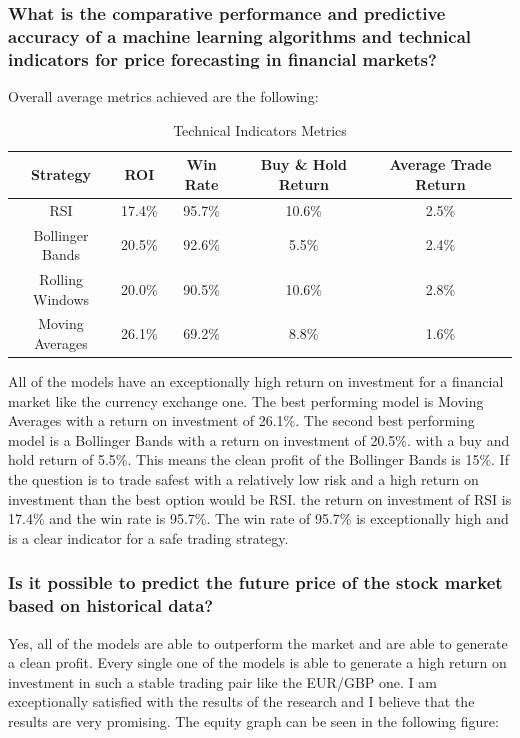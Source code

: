 \documentclass{imc-inf}
\begin{document}
	\subsubsection{
		What is the comparative performance and predictive accuracy of a machine learning
		algorithms and technical indicators for price forecasting in financial markets?
	}
	Overall average metrics achieved are the following:
	\begin{table}[h!]
		\centering
		\begin{tabular}{|c|c|c|c|c|}
			\hline
			\textbf{Strategy} &		\textbf{ROI} & \textbf{Win Rate} & \textbf{Buy \& Hold Return} & \textbf{Average Trade Return} \\ \hline
			RSI             				 & 17.4\% & 95.7\% & 10.6\% & 2.5\%  \\ \hline
			Bollinger Bands            				 & 20.5\% & 92.6\%  & 5.5\% & 2.4\% \\ \hline
			Rolling Windows      	 				 &  20.0\% & 90.5\% & 10.6\% & 2.8\% \\ \hline
			Moving Averages        		 				 & 26.1\% & 69.2\% & 8.8\% & 1.6\% \\ \hline
		\end{tabular}
		\caption{Technical Indicators Metrics}
		\label{tab:technical_indicators_metrics}
	\end{table}
	
	All of the models have an exceptionally high return on investment for a financial market like the currency exchange one. The best performing model is Moving Averages with a return on investment of 26.1\%.
	The second best performing model is a Bollinger Bands with a return on investment of 20.5\%. with a buy and hold return of 5.5\%. This means the clean profit of the Bollinger Bands is 15\%.
	If the question is to trade safest with a relatively low risk and a high return on investment than the best option would be RSI. the return on investment of RSI is 17.4\% and the win rate is 95.7\%.
	The win rate of 95.7\% is exceptionally high and is a clear indicator for a safe trading strategy. 
	\subsubsection{Is it possible to predict the future price of the stock market based on historical data?}
	Yes, all of the models are able to outperform the market and are able to generate a clean profit. Every single one of the models is able to generate a high return on investment in such a stable trading pair like the EUR/GBP one. 
	I am exceptionally satisfied with the results of the research and I believe that the results are very promising. 
	The equity graph can be seen in the following figure:
	
\end{document}
